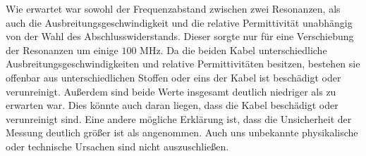 Wie erwartet war sowohl der Frequenzabstand zwischen zwei Resonanzen, als auch die Ausbreitungsgeschwindigkeit und die relative Permittivität unabhängig von der Wahl des Abschlusswiderstands. Dieser sorgte nur für eine Verschiebung der Resonanzen um einige $100$ MHz. Da die beiden Kabel unterschiedliche Ausbreitungsgeschwindigkeiten und relative Permittivitäten besitzen, bestehen sie offenbar aus unterschiedlichen Stoffen oder eins der Kabel ist beschädigt oder verunreinigt. Außerdem sind beide Werte insgesamt deutlich niedriger als zu erwarten war. Dies könnte auch daran liegen, dass die Kabel beschädigt oder verunreinigt sind. Eine andere mögliche Erklärung ist, dass die Unsicherheit der Messung deutlich größer ist als angenommen. Auch uns unbekannte physikalische oder technische Ursachen sind nicht auszuschließen.